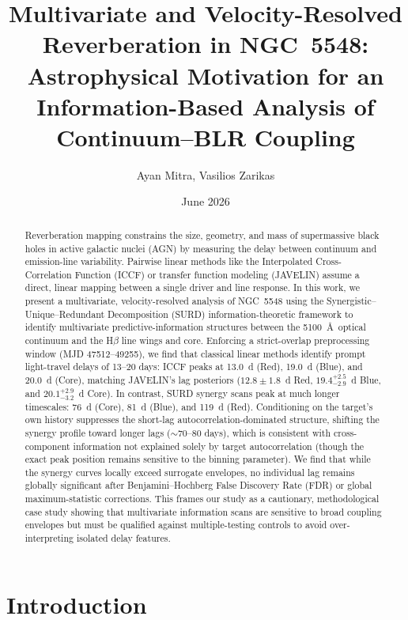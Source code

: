 \documentclass[12pt, a4paper]{article}
\title 
{Multivariate and Velocity-Resolved Reverberation in NGC~5548:\\
Astrophysical Motivation for an Information-Based Analysis of Continuum--BLR Coupling}
\author{ Ayan Mitra, Vasilios Zarikas}
\date{June 2026}
\begin{document}
\maketitle



\begin{abstract}
Reverberation mapping constrains the size, geometry, and mass of supermassive black holes in active galactic nuclei (AGN) by measuring the delay between continuum and emission-line variability. Pairwise linear methods like the Interpolated Cross-Correlation Function (ICCF) or transfer function modeling (JAVELIN) assume a direct, linear mapping between a single driver and line response. In this work, we present a multivariate, velocity-resolved analysis of NGC~5548 using the Synergistic–Unique–Redundant Decomposition (SURD) information-theoretic framework to identify multivariate predictive-information structures between the 5100~\AA\ optical continuum and the H\(\beta\) line wings and core. Enforcing a strict-overlap preprocessing window (MJD 47512--49255), we find that classical linear methods identify prompt light-travel delays of 13--20 days: ICCF peaks at 13.0~d (Red), 19.0~d (Blue), and 20.0~d (Core), matching JAVELIN's lag posteriors ($12.8 \pm 1.8$~d Red, $19.4_{-2.9}^{+2.5}$~d Blue, and $20.1_{-3.2}^{+2.9}$~d Core). In contrast, SURD synergy scans peak at much longer timescales: 76~d (Core), 81~d (Blue), and 119~d (Red). Conditioning on the target's own history suppresses the short-lag autocorrelation-dominated structure, shifting the synergy profile toward longer lags ($\sim 70$--80 days), which is consistent with cross-component information not explained solely by target autocorrelation (though the exact peak position remains sensitive to the binning parameter). We find that while the synergy curves locally exceed surrogate envelopes, no individual lag remains globally significant after Benjamini–Hochberg False Discovery Rate (FDR) or global maximum-statistic corrections. This frames our study as a cautionary, methodological case study showing that multivariate information scans are sensitive to broad coupling envelopes but must be qualified against multiple-testing controls to avoid over-interpreting isolated delay features.
\end{abstract}








\section{Introduction}
\end{document}
